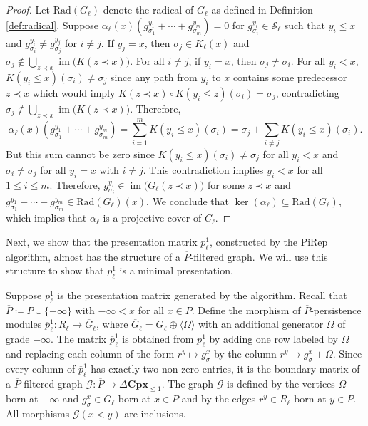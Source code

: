 \documentclass[english,a4paper,nolineno,cleveref]{socg-lipics-v2021}
\DeclareMathOperator{\im}{im}
\begin{document}
\begin{proof}
Let $\mathrm{Rad}(G_\ell)$ denote the radical of $G_\ell$ as defined in Definition \ref{def:radical}. Suppose $\alpha_\ell(x)(g^{y_1}_{\sigma_1}+\cdots+g^{y_m}_{\sigma_m})=0$ for $g^{y_i}_{\sigma_i}\in \mathcal{S}_\ell$ such that $y_i\leq x$ and $g^{y_i}_{\sigma_i}\neq g^{y_j}_{\sigma_j}$ for $i\neq j$. If $y_j=x$, then $\sigma_j\in K_\ell(x)$ and $\sigma_j\notin \bigcup_{z\prec x}\im \!\big(K(z\prec x)\big)$. For all $i\neq j$, if $y_i=x$, then $\sigma_j\neq\sigma_i$. For all $y_i<x$, $K(y_i\leq x)(\sigma_i)\neq \sigma_j$ since any path from $y_i$ to $x$ contains some predecessor $z\prec x$ which would imply $K(z\prec x)\circ K(y_i\leq z)(\sigma_i)=\sigma_j$, contradicting $\sigma_j\notin \bigcup_{z\prec x}\im \!\big(K(z\prec x)\big)$. Therefore,
\begin{equation*}
\alpha_\ell(x)(g^{y_1}_{\sigma_1}+\cdots+g^{y_m}_{\sigma_m})=\sum_{i=1}^m K(y_i\leq x)(\sigma_i)=\sigma_j+\sum_{i\neq j}K(y_i\leq x)(\sigma_i).
\end{equation*}
But this sum cannot be zero since $K(y_i\leq x)(\sigma_i)\neq \sigma_j$ for all $y_i<x$ and $\sigma_i\neq\sigma_j$ for all $y_i=x$ with $i\neq j$. This contradiction implies $y_i<x$ for all $1\leq i\leq m$. Therefore, $g^{y_i}_{\sigma_i}\in \im \!\big(G_\ell(z\prec x)\big)$ for some $z\prec x$ and $g^{y_1}_{\sigma_1}+\cdots+g^{y_m}_{\sigma_m}\in \mathrm{Rad}(G_\ell)(x)$. We conclude that $\ker(\alpha_\ell)\subseteq \mathrm{Rad}(G_\ell)$, which implies that $\alpha_\ell$ is a projective cover of $C_\ell$.    
\end{proof}


Next, we show that the presentation matrix $p_\ell^1$, constructed by the {\sc PiRep} algorithm, almost has the structure of a $\overline{P}$-filtered graph. We will use this structure to show that $p_\ell^1$ is a minimal presentation.

\begin{definition} \label{def:boundary_p}
Suppose $p^1_\ell$ is the presentation matrix generated by the algorithm. Recall that $\overline{P}\coloneqq P\cup\{-\infty\}$ with $-\infty<x$ for all $x\in P$. Define the morphism of $\overline{P}$-persistence modules $\overline{p}^1_\ell\colon R_\ell\rightarrow \overline{G}_\ell$, where $\overline{G}_\ell=G_\ell\oplus \langle\Omega\rangle$ with an additional generator $\Omega$ of grade $-\infty$. The matrix $\overline{p}_\ell^1$ is obtained from $p_\ell^1$ by adding one row labeled by $\Omega$ and replacing each column of the form $r^y\mapsto g^x_\sigma$ by the column $r^y\mapsto g^x_\sigma+\Omega$. Since every column of $\overline{p}_\ell^1$ has exactly two non-zero entries, it is the boundary matrix of a $\overline{P}$-filtered graph $\mathcal{G}\colon \overline{P}\rightarrow\Delta\mathbf{Cpx}_{\leq 1}$. The graph $\mathcal{G}$ is defined by the vertices $\Omega$ born at $-\infty$ and $g^x_\sigma\in G_\ell$ born at $x\in P$ and by the edges $r^y\in R_\ell$ born at $y\in P$. All morphisms $\mathcal{G}(x< y)$ are inclusions.
\end{definition}
\end{document}
